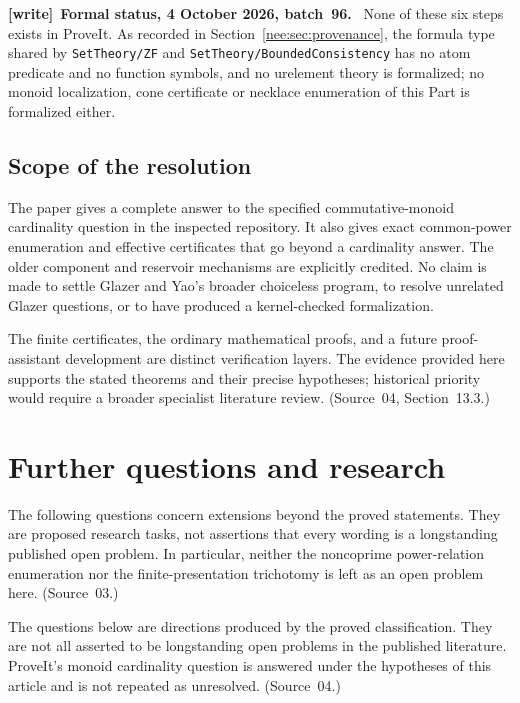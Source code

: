 \documentclass[11pt,letterpaper]{article}
\numberwithin{equation}{section}
\theoremstyle{plain}
\theoremstyle{definition}
\theoremstyle{remark}
\newenvironment{writenote}[1][]{\par\smallskip\begingroup\small\raggedright
 \setlength{\parindent}{1.25em}\noindent\textbf{[write]}\if\relax\detokenize{#1}\relax\else~\textbf{#1.}\fi\ }%
 {\par\endgroup\smallskip}
\begin{document}
\begin{writenote}[Formal status, 4 October 2026, batch~96]
None of these six steps exists in ProveIt. As recorded in Section~\ref{nee:sec:provenance}, the formula type shared by \nolinkurl{SetTheory/ZF} and \nolinkurl{SetTheory/BoundedConsistency} has no atom predicate and no function symbols, and no urelement theory is formalized; no monoid localization, cone certificate or necklace enumeration of this Part is formalized either.
\end{writenote}

\subsection{Scope of the resolution}

The paper gives a complete answer to the specified
commutative-monoid cardinality question in the
inspected repository. It also gives exact common-power
enumeration and effective certificates that go
beyond a cardinality answer. The older component
and reservoir mechanisms are explicitly credited.
No claim is made to settle Glazer and Yao's
broader choiceless program, to resolve unrelated
Glazer questions, or to have produced a
kernel-checked formalization.

The finite certificates, the ordinary mathematical
proofs, and a future proof-assistant development
are distinct verification layers. The evidence
provided here supports the stated theorems and
their precise hypotheses; historical priority
would require a broader specialist literature
review. (Source~04, Section~13.3.)

\section{Further questions and research}\label{nee:aa:sec:future}
\label{nee:ci:sec:future}

The following questions concern extensions beyond the proved statements.
They are proposed research tasks, not assertions that every wording is a
longstanding published open problem. In particular, neither the noncoprime
power-relation enumeration nor the finite-presentation trichotomy is left
as an open problem here. (Source~03.)

The questions below are directions produced by the proved
classification. They are not all asserted to be longstanding
open problems in the published literature. ProveIt's monoid
cardinality question is answered under the hypotheses of
this article and is not repeated as unresolved. (Source~04.)
\end{document}
